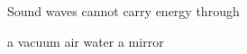 \documentclass[answers]{exam}
\begin{document}
\begin{questions}


\question 
Sound waves cannot carry energy through

\begin{randomizechoices}
    \correctchoice a vacuum
    \choice air
    \choice water
    \choice a mirror
\end{randomizechoices}






\end{questions}
\end{document}
